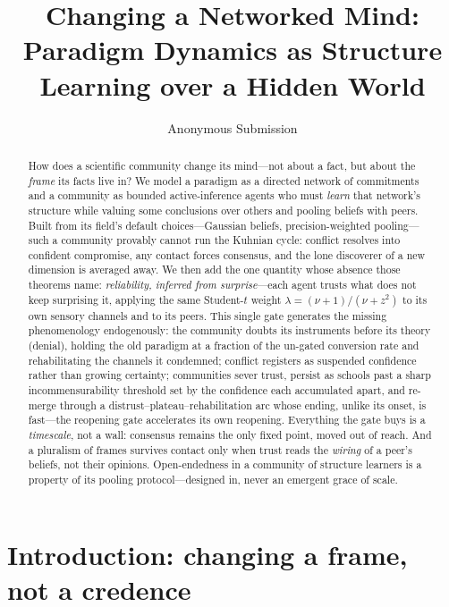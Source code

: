 \documentclass[runningheads]{llncs}
\title{Changing a Networked Mind: Paradigm Dynamics as Structure Learning over a Hidden World}
\author{Anonymous Submission}
\institute{Anonymous Institution(s)}
\begin{document}
\maketitle

\begin{abstract}
How does a scientific community change its mind---not about a fact, but about the \emph{frame} its
facts live in? We model a paradigm as a directed network of commitments and a community as bounded
active-inference agents who must \emph{learn} that network's structure while valuing some
conclusions over others and pooling beliefs with peers. Built from its field's default
choices---Gaussian beliefs, precision-weighted pooling---such a community provably cannot run the
Kuhnian cycle: conflict resolves into confident compromise, any contact forces consensus, and the
lone discoverer of a new dimension is averaged away. We then add the one quantity whose absence
those theorems name: \emph{reliability, inferred from surprise}---each agent trusts what does not
keep surprising it, applying the same Student-$t$ weight $\lambda=(\nu+1)/(\nu+z^2)$ to its own
sensory channels and to its peers. This single gate generates the missing phenomenology
endogenously: the community doubts its instruments before its theory (denial), holding the old
paradigm at a fraction of the un-gated conversion rate and rehabilitating the channels it
condemned; conflict registers as suspended confidence rather than growing certainty; communities
sever trust, persist as schools past a sharp incommensurability threshold set by the confidence
each accumulated apart, and re-merge through a distrust--plateau--rehabilitation arc whose
ending, unlike its onset, is fast---the reopening gate accelerates its own reopening. Everything the gate buys is a
\emph{timescale}, not a wall: consensus remains the only fixed point, moved out of reach. And a
pluralism of frames survives contact only when trust reads the \emph{wiring} of a peer's beliefs,
not their opinions. Open-endedness in a community of structure learners is a property of its
pooling protocol---designed in, never an emergent grace of scale.

\end{abstract}

\section{Introduction: changing a frame, not a credence}
\label{sec:background}
\end{document}

